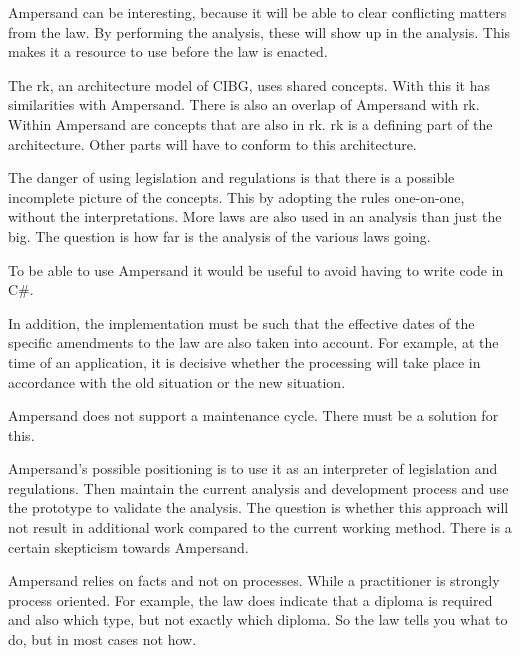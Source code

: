 

{Ampersand can be interesting, because it will be able to clear conflicting matters from the law. 
By performing the analysis, these will show up in the analysis. 
This makes it a resource to use before the law is enacted.}

{The \acrlong{rk}, an architecture model of CIBG, uses shared concepts. 
With this it has similarities with Ampersand. 
There is also an overlap of Ampersand with \acrlong{rk}. 
Within Ampersand are concepts that are also in \acrlong{rk}. 
\acrlong{rk} is a defining part of the architecture. Other parts will have to conform to this architecture.}

{The danger of using legislation and regulations is that there is a possible incomplete picture of the concepts. 
This by adopting the rules one-on-one, without the interpretations.
More laws are also used in an analysis than just the \acrshort{big}. 
The question is how far is the analysis of the various laws going.}

{To be able to use Ampersand it would be useful to avoid having to write code in C\#.}

{In addition, the implementation must be such that the effective dates of the specific amendments to the law are also taken into account. 
For example, at the time of an application, it is decisive whether the processing will take place in accordance with the old situation or the new situation.}

{Ampersand does not support a maintenance cycle. 
There must be a solution for this.}

{Ampersand's possible positioning is to use it as an interpreter of legislation and regulations. 
Then maintain the current analysis and development process and use the prototype to validate the analysis.
The question is whether this approach will not result in additional work compared to the current working method. 
There is a certain skepticism towards Ampersand.}

{Ampersand relies on facts and not on processes. 
While a practitioner is strongly process oriented. For example, the law does indicate that a diploma is required and also which type, but not exactly which diploma. 
So the law tells you what to do, but in most cases not how.}

